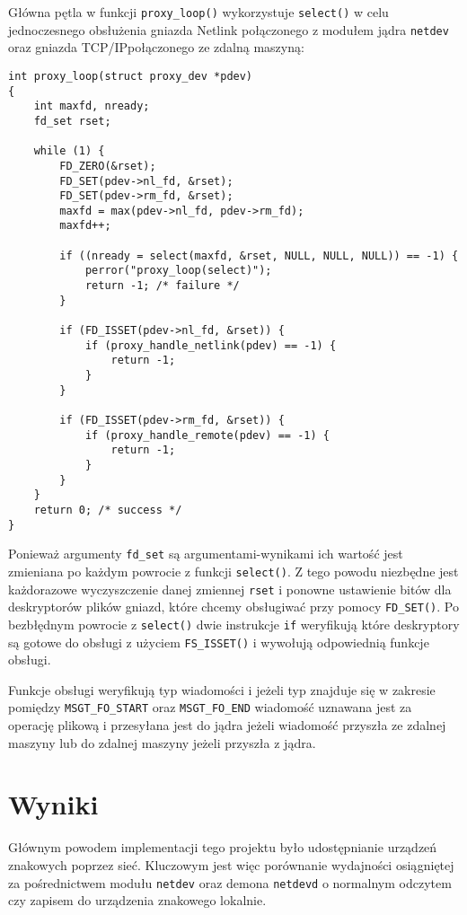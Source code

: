 \documentclass[10pt]{article}
\begin{document}
Główna pętla w funkcji \texttt{proxy\_loop()} wykorzystuje \texttt{select()} w celu jednoczesnego obsłużenia gniazda Netlink połączonego z modułem jądra \texttt{netdev} oraz gniazda TCP/IP\@ połączonego ze zdalną maszyną:

\begin{verbatim}
int proxy_loop(struct proxy_dev *pdev)
{
    int maxfd, nready;
    fd_set rset;

    while (1) {
        FD_ZERO(&rset);
        FD_SET(pdev->nl_fd, &rset);
        FD_SET(pdev->rm_fd, &rset);
        maxfd = max(pdev->nl_fd, pdev->rm_fd);
        maxfd++;

        if ((nready = select(maxfd, &rset, NULL, NULL, NULL)) == -1) {
            perror("proxy_loop(select)");
            return -1; /* failure */
        }

        if (FD_ISSET(pdev->nl_fd, &rset)) {
            if (proxy_handle_netlink(pdev) == -1) {
                return -1;
            }
        }

        if (FD_ISSET(pdev->rm_fd, &rset)) {
            if (proxy_handle_remote(pdev) == -1) {
                return -1;
            }
        }
    }
    return 0; /* success */
}
\end{verbatim}

Ponieważ argumenty \texttt{fd\_set} są argumentami-wynikami ich wartość jest zmieniana po każdym powrocie z funkcji \texttt{select()}. Z tego powodu niezbędne jest każdorazowe wyczyszczenie danej zmiennej \texttt{rset} i ponowne ustawienie bitów dla deskryptorów plików gniazd, które chcemy obsługiwać przy pomocy \texttt{FD\_SET()}. Po bezbłędnym powrocie z \texttt{select()} dwie instrukcje \texttt{if} weryfikują które deskryptory są gotowe do obsługi z użyciem \texttt{FS\_ISSET()} i wywołują odpowiednią funkcje obsługi.

Funkcje obsługi weryfikują typ wiadomości i jeżeli typ znajduje się w zakresie pomiędzy \texttt{MSGT\_FO\_START} oraz \texttt{MSGT\_FO\_END} wiadomość uznawana jest za operację plikową i przesyłana jest do jądra jeżeli wiadomość przyszła ze zdalnej maszyny lub do zdalnej maszyny jeżeli przyszła z jądra.

\section{Wyniki}

Głównym powodem implementacji tego projektu było udostępnianie urządzeń znakowych poprzez sieć. Kluczowym jest więc porównanie wydajności osiągniętej za pośrednictwem modułu \texttt{netdev} oraz demona \texttt{netdevd} o normalnym odczytem czy zapisem do urządzenia znakowego lokalnie.
\end{document}
